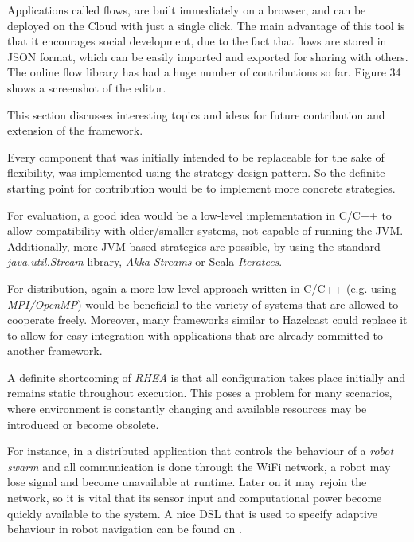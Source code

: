 \documentclass{dithesis}
\begin{document}
Applications called flows, are built immediately on a browser, and can be deployed on the Cloud with just a single click. The main advantage of this tool is that it encourages social development, due to the fact that flows are stored in JSON format, which can be easily imported and exported for sharing with others. The online flow library has had a huge number of contributions so far. Figure 34 shows a screenshot of the editor.



This section discusses interesting topics and ideas for future contribution and extension of the framework.


Every component that was initially intended to be replaceable for the sake of flexibility, was implemented using the strategy design pattern. So the definite starting point for contribution would be to implement more concrete strategies.

For evaluation, a good idea would be a low-level implementation in C/C++ to allow compatibility with older/smaller systems, not capable of running the JVM. Additionally, more JVM-based strategies are possible, by using the standard \textit{java.util.Stream} library, \textit{Akka Streams} or Scala \textit{Iteratees}\cite{iteratees}.

For distribution, again a more low-level approach written in C/C++ (e.g. using \textit{MPI/OpenMP}) would be beneficial to the variety of systems that are allowed to cooperate freely. Moreover, many frameworks similar to Hazelcast could replace it to allow for easy integration with applications that are already committed to another framework.


A definite shortcoming of \textit{RHEA} is that all configuration takes place initially and remains static throughout execution. This poses a problem for many scenarios, where environment is constantly changing and available resources may be introduced or become obsolete. 

For instance, in a distributed application that controls the behaviour of a \textit{robot swarm} and all communication is done through the WiFi network, a robot may lose signal and become unavailable at runtime. Later on it may rejoin the network, so it is vital that its sensor input and computational power become quickly available to the system. A nice DSL that is used to specify adaptive behaviour in robot navigation can be found on \cite{reconf_robot}.
\end{document}
